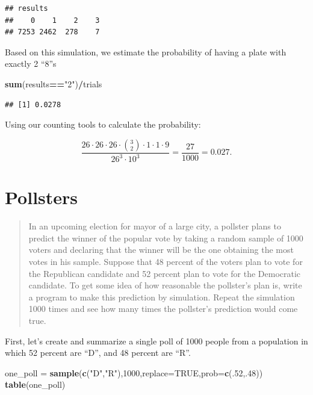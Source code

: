 \documentclass[
]{book}
\newenvironment{Shaded}{\begin{snugshade}}{\end{snugshade}}
\newcommand{\AttributeTok}[1]{\textcolor[rgb]{0.13,0.29,0.53}{#1}}
\newcommand{\ConstantTok}[1]{\textcolor[rgb]{0.56,0.35,0.01}{#1}}
\newcommand{\DecValTok}[1]{\textcolor[rgb]{0.00,0.00,0.81}{#1}}
\newcommand{\FunctionTok}[1]{\textcolor[rgb]{0.13,0.29,0.53}{\textbf{#1}}}
\newcommand{\NormalTok}[1]{#1}
\newcommand{\OtherTok}[1]{\textcolor[rgb]{0.56,0.35,0.01}{#1}}
\newcommand{\SpecialCharTok}[1]{\textcolor[rgb]{0.81,0.36,0.00}{\textbf{#1}}}
\newcommand{\StringTok}[1]{\textcolor[rgb]{0.31,0.60,0.02}{#1}}
\theoremstyle{definition}
\theoremstyle{definition}
\theoremstyle{definition}
\theoremstyle{definition}
\theoremstyle{remark}
\begin{document}
\begin{verbatim}
## results
##    0    1    2    3 
## 7253 2462  278    7
\end{verbatim}

Based on this simulation, we estimate the probability of having a plate with exactly 2 ``8''s

\begin{Shaded}
\begin{Highlighting}[]
\FunctionTok{sum}\NormalTok{(results}\SpecialCharTok{==}\StringTok{"2"}\NormalTok{)}\SpecialCharTok{/}\NormalTok{trials}
\end{Highlighting}
\end{Shaded}

\begin{verbatim}
## [1] 0.0278
\end{verbatim}

Using our counting tools to calculate the probability:

\[\frac{26\cdot 26\cdot 26 \cdot \binom{3}{2} \cdot 1 \cdot 1 \cdot 9}{26^3\cdot 10^3}= \frac{27}{1000} = 0.027.\]

\section{Pollsters}\label{pollsters-R}

\begin{quote}
In an upcoming election for mayor of a large city, a pollster plans to predict the winner of the popular vote by taking a random sample of 1000 voters and declaring that the winner will be the one obtaining the most votes in his sample. Suppose that 48 percent of the voters plan to vote for the Republican candidate and 52 percent plan to vote for the Democratic candidate. To get some idea of how reasonable the pollster's plan is, write a program to make this prediction by simulation. Repeat the simulation 1000 times and see how many times the pollster's prediction would come true.
\end{quote}

First, let's create and summarize a single poll of 1000 people from a population in which 52 percent are ``D'', and 48 percent are ``R''.

\begin{Shaded}
\begin{Highlighting}[]
\NormalTok{one\_poll }\OtherTok{=} \FunctionTok{sample}\NormalTok{(}\FunctionTok{c}\NormalTok{(}\StringTok{"D"}\NormalTok{,}\StringTok{"R"}\NormalTok{),}\DecValTok{1000}\NormalTok{,}\AttributeTok{replace=}\ConstantTok{TRUE}\NormalTok{,}\AttributeTok{prob=}\FunctionTok{c}\NormalTok{(.}\DecValTok{52}\NormalTok{,.}\DecValTok{48}\NormalTok{))}
\FunctionTok{table}\NormalTok{(one\_poll)}
\end{Highlighting}
\end{Shaded}
\end{document}
